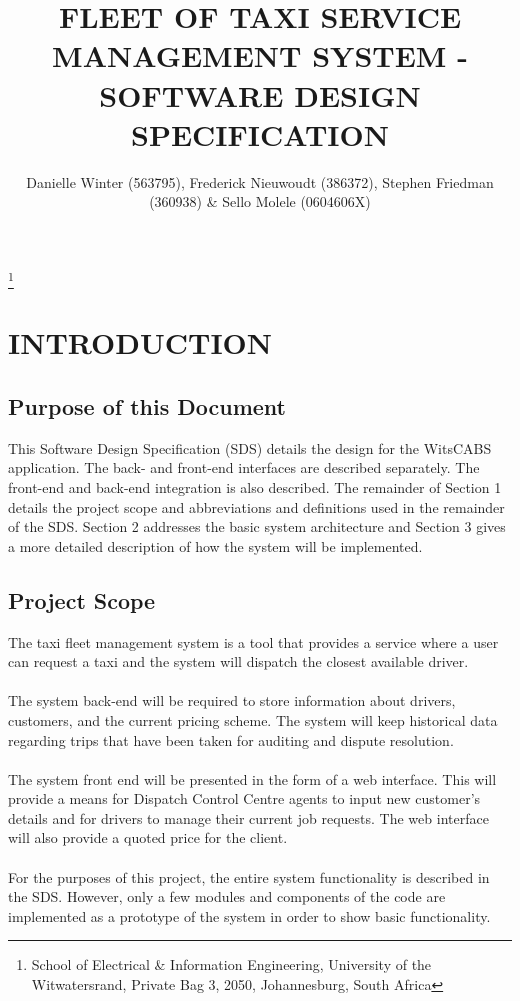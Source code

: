 \documentclass[10pt, onecolumn]{witseiepaper}
\begin{document}
\title{FLEET OF TAXI SERVICE MANAGEMENT SYSTEM - SOFTWARE DESIGN SPECIFICATION}

\author{Danielle Winter (563795), Frederick Nieuwoudt (386372), Stephen Friedman (360938) \& Sello Molele (0604606X)}
\thanks{School of Electrical \& Information Engineering, University of the
Witwatersrand, Private Bag 3, 2050, Johannesburg, South Africa}


%

\maketitle
\thispagestyle{empty}\pagestyle{empty}


%
\section{INTRODUCTION}
\subsection{Purpose of this Document}
This Software Design Specification (SDS) details the design for the WitsCABS application. The back- and front-end interfaces are described separately. The front-end and back-end integration is also described. The remainder of Section 1 details the project scope and abbreviations and definitions used in the remainder of the SDS. Section 2 addresses the basic system architecture and Section 3 gives a more detailed description of how the system will be implemented. 
\subsection{Project Scope}
The taxi fleet management system is a tool that provides a service where a user can request a taxi and the system will dispatch the closest available driver.\\\\
The system back-end will be required to store information about drivers, customers, and the current pricing scheme. The system will keep historical data regarding trips that have been taken for auditing and dispute resolution.\\\\
The system front end will be presented in the form of a web interface. This will provide a means for Dispatch Control Centre agents to input new customer's details and for drivers to manage their current job requests. The web interface will also provide a quoted price for the client.\\\\
For the purposes of this project, the entire system functionality is described in the SDS. However, only a few modules and components of the code are implemented as a prototype of the system in order to show basic functionality.
\end{document}
